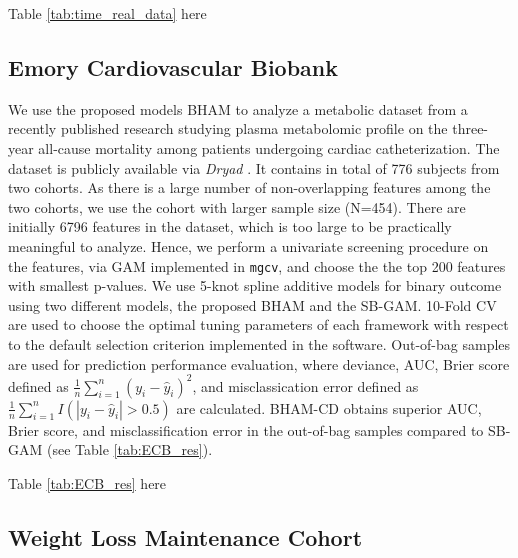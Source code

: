 \documentclass[AMA,STIX1COL,]{WileyNJD-v2}
\begin{document}
\begin{center}
Table \ref{tab:time_real_data} here
\end{center}

\subsection{Emory Cardiovascular Biobank}
\label{sec:ECB}

We use the proposed models BHAM to analyze a metabolic dataset from a
recently published research \citep{Mehta2020} studying plasma
metabolomic profile on the three-year all-cause mortality among patients
undergoing cardiac catheterization. The dataset is publicly available
via \textit{Dryad} \citep{Mehta2020_data}. It contains in total of 776
subjects from two cohorts. As there is a large number of non-overlapping
features among the two cohorts, we use the cohort with larger sample
size (N=454). There are initially 6796 features in the dataset, which is
too large to be practically meaningful to analyze. Hence, we perform a
univariate screening procedure on the features, via GAM implemented in
\texttt{mgcv}, and choose the the top 200 features with smallest
p-values. We use 5-knot spline additive models for binary outcome using
two different models, the proposed BHAM and the SB-GAM. 10-Fold CV are
used to choose the optimal tuning parameters of each framework with
respect to the default selection criterion implemented in the software.
Out-of-bag samples are used for prediction performance evaluation, where
deviance, AUC, Brier score defined as
\(\frac{1}{n}\sum\limits^{n}_{i=1}(y_i - \hat y_i)^2\), and
misclassication error defined as
\(\frac{1}{n}\sum\limits^{n}_{i=1}I(|y_i - \hat y_i|>0.5)\) are
calculated. BHAM-CD obtains superior AUC, Brier score, and
misclassification error in the out-of-bag samples compared to SB-GAM
(see Table \ref{tab:ECB_res}).

\begin{center}
Table \ref{tab:ECB_res} here
\end{center}

\subsection{Weight Loss Maintenance Cohort}
\end{document}
